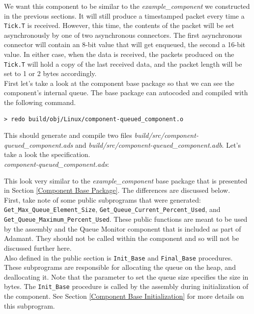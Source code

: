 We want this component to be similar to the \textit{example\_component} we constructed in the previous sections. It will still produce a timestamped packet every time a \texttt{Tick.T} is received. However, this time, the contents of the packet will be set asynchronously by one of two asynchronous connectors. The first asynchronous connector will contain an 8-bit value that will get enqueued, the second a 16-bit value. In either case, when the data is received, the packets produced on the \texttt{Tick.T} will hold a copy of the last received data, and the packet length will be set to 1 or 2 bytes accordingly. \\

First let's take a look at the component base package so that we can see the component's internal queue. The base package can autocoded and compiled with the following command.

\vspace{5mm} %
\begin{verbatim}
> redo build/obj/Linux/component-queued_component.o
\end{verbatim}
\vspace{5mm} %

This should generate and compile two files \textit{build/src/component-queued\_component.ads} and \textit{build/src/component-queued\_component.adb}. Let's take a look the specification. \\

\textit{component-queued\_component.ads}:

This look very similar to the \textit{example\_component} base package that is presented in Section \ref{Component Base Package}. The differences are discussed below. \\

First, take note of some public subprograms that were generated: \texttt{Get\_Max\_Queue\_Element\_Size}, \texttt{Get\_Queue\_Current\_Percent\_Used}, and \texttt{Get\_Queue\_Maximum\_Percent\_Used}. These public functions are meant to be used by the assembly and the Queue Monitor component that is included as part of Adamant. They should not be called within the component and so will not be discussed further here. \\

Also defined in the public section is \texttt{Init\_Base} and \texttt{Final\_Base} procedures. These subprograms are responsible for allocating the queue on the heap, and deallocating it. Note that the parameter to set the queue size specifies the size in bytes. The \texttt{Init\_Base} procedure is called by the assembly during initialization of the component. See Section \ref{Component Base Initialization} for more details on this subprogram. \\

